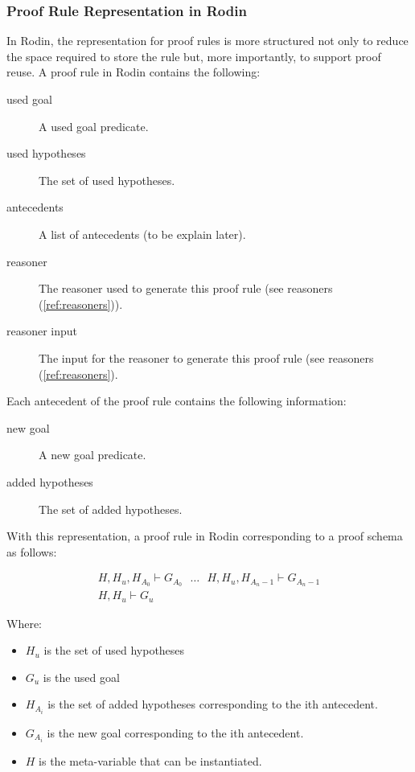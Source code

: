 
\subsubsection{Proof Rule Representation in Rodin}

In Rodin, the representation for proof rules is more structured not only to reduce the space required to store the rule but, more importantly, to support proof reuse.
A proof rule in Rodin contains the following:

\begin{description}
	\item[used goal] A used goal predicate. 
	\item[used hypotheses] The set of used hypotheses. 
	\item[antecedents] A list of antecedents (to be explain later). 
	\item[reasoner] The reasoner used to generate this proof rule (see reasoners (\ref{ref:reasoners})). 
	\item[reasoner input] The input for the reasoner to generate this proof rule (see reasoners (\ref{ref:reasoners}). 
\end{description}

Each antecedent of the proof rule contains the following information:

\begin{description}
	\item[new goal] A new goal predicate. 
	\item[added hypotheses] The set of added hypotheses. 
\end{description}

With this representation, a proof rule in Rodin corresponding to a proof schema as follows: 

$$\begin{array}{c} H, H_u, H_{A_0} \vdash G_{A_0} ~~~\ldots~~~ H, H_u, H_{A_n-1} \vdash G_{A_n-1} \\ \hline H, H_u \vdash G_u \end{array} $$

Where:
\begin{itemize}
	\item     $H_u$ is the set of used hypotheses 
	\item     $G_u$ is the used goal 
	\item     $H_{A_i}$ is the set of added hypotheses corresponding to the ith antecedent. 
	\item     $G_{A_i}$ is the new goal corresponding to the ith antecedent. 
	\item     $H$ is the meta-variable that can be instantiated. 
\end{itemize}

